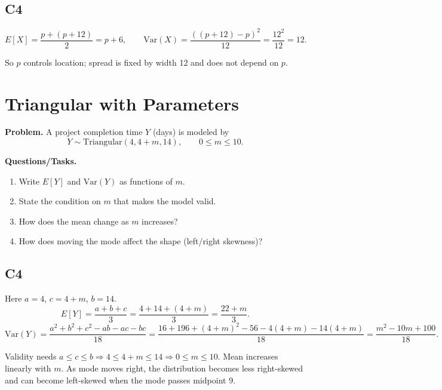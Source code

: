 \subsection*{C4}
\[
E[X]=\frac{p+(p+12)}{2}=p+6,
\qquad
\mathrm{Var}(X)=\frac{((p+12)-p)^2}{12}=\frac{12^2}{12}=12.
\]
\begin{center}
\end{center}
So \(p\) controls location; spread is fixed by width 12 and does not depend on \(p\).

\section{Triangular with Parameters}

\textbf{Problem.}
A project completion time \(Y\) (days) is modeled by
\[
Y\sim \text{Triangular}(4,4+m,14),\qquad 0\le m\le 10.
\]

\textbf{Questions/Tasks.}
\begin{enumerate}[label=\textbf{\alph*)}]
  \item Write \(E[Y]\) and \(\mathrm{Var}(Y)\) as functions of \(m\).
  \item State the condition on \(m\) that makes the model valid.
  \item How does the mean change as \(m\) increases?
  \item How does moving the mode affect the shape (left/right skewness)?
\end{enumerate}

\subsection*{C4}
Here \(a=4\), \(c=4+m\), \(b=14\).
\[
E[Y]=\frac{a+b+c}{3}=\frac{4+14+(4+m)}{3}=\frac{22+m}{3}.
\]
\[
\mathrm{Var}(Y)=\frac{a^2+b^2+c^2-ab-ac-bc}{18}
=\frac{16+196+(4+m)^2-56-4(4+m)-14(4+m)}{18}
=\frac{m^2-10m+100}{18}.
\]
\begin{center}
\end{center}
Validity needs \(a\le c\le b\Rightarrow 4\le 4+m\le 14\Rightarrow 0\le m\le 10\).
Mean increases linearly with \(m\). As mode moves right, the distribution becomes less right-skewed and can become left-skewed when the mode passes midpoint 9.

